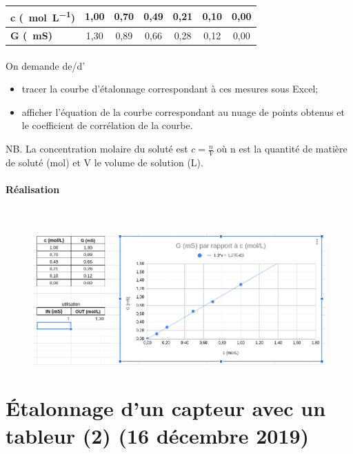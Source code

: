 \documentclass{article}
\begin{document}
\begin{table}[H]
    \begin{center}
        \begin{tabular}{l|c|c|c|c|c|c}
            \textbf{c (\SI{}{\mol\per\liter})} & 1,00 & 0,70 & 0,49 & 0,21 & 0,10 & 0,00 \\
            \hline
            \textbf{G (\SI{}{\milli\siemens})} & 1,30 & 0,89 & 0,66 & 0,28 & 0,12 & 0,00 \\
        \end{tabular}
    \end{center}
\end{table}

\paragraph{}
On demande de/d'
\begin{itemize}
    \item tracer la courbe d'étalonnage correspondant à ces mesures sous Excel;
    \item afficher l'équation de la courbe correspondant au nuage de points obtenus et le coefficient de corrélation de la courbe.
\end{itemize}
NB. La concentration molaire du soluté est $c = \frac{n}{V}$ où n est la quantité de matière de soluté (mol) et V le volume de solution (L).

\paragraph{Réalisation}
\
\begin{figure}[H]
    \centering
    \includegraphics[width=\linewidth]{./images/004-etalonnage-exemple.png}
\end{figure}

\newpage
\section{Étalonnage d'un capteur avec un tableur (2) (16 décembre 2019)}
\end{document}
